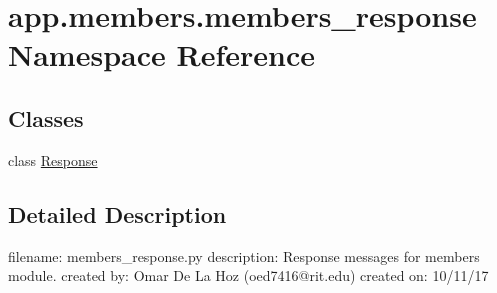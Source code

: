 \hypertarget{namespaceapp_1_1members_1_1members__response}{}\section{app.\+members.\+members\+\_\+response Namespace Reference}
\label{namespaceapp_1_1members_1_1members__response}
\subsection*{Classes}
\begin{DoxyCompactItemize}
\item 
class \mbox{\hyperlink{classapp_1_1members_1_1members__response_1_1_response}{Response}}
\end{DoxyCompactItemize}


\subsection{Detailed Description}
\begin{DoxyVerb}filename: members_response.py
description: Response messages for members module.
created by: Omar De La Hoz (oed7416@rit.edu)
created on: 10/11/17
\end{DoxyVerb}
 
